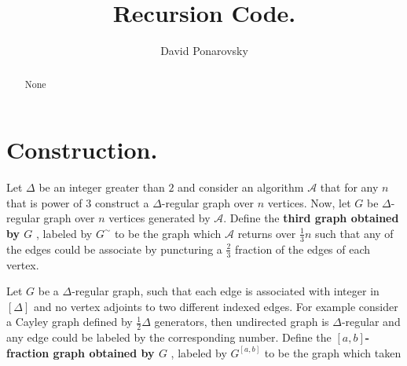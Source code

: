 \documentclass{article}
\begin{document}
\title{Recursion Code.} 
\author{David Ponarovsky}
\maketitle
\begin{abstract}None 
\end{abstract}

\section{Construction.}
\begin{definition} 
  Let $\Delta$ be an integer greater than $2$ and consider an algorithm $\mathcal{A}$ that for any $n$ that is power of $3$ construct a $\Delta$-regular graph over $n$ vertices. Now, let $G$ be $\Delta$-regular graph over $n$ vertices generated by $\mathcal{A}$. Define the \textbf{third graph obtained by $G$ } , labeled by $G^{\sim}$ to be the graph which $\mathcal{A}$ returns over $\frac{1}{3} n$ such that any of the edges could be associate by puncturing a $\frac{2}{3}$ fraction of the edges of each vertex.  
\end{definition}

\begin{definition}
  Let $G$ be a $\Delta$-regular graph, such that each edge is associated with integer in $[\Delta]$ and no vertex adjoints to two different indexed edges. For example consider a Cayley graph defined by $\frac{1}{2}\Delta$ generators, then undirected graph is $\Delta$-regular and any edge could be labeled by the corresponding number. Define the \textbf{$[a,b]$-fraction graph obtained by $G$ }, labeled by $G^{[a,b]}$ to be the graph which taken 
\end{definition}
\end{document}
